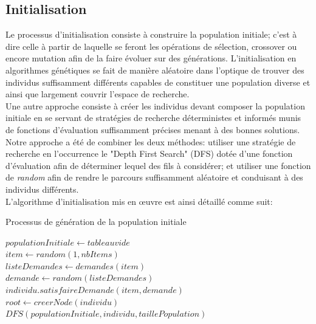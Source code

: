 \documentclass[12pt,a4paper]{article}
\begin{document}
	\subsection{Initialisation}
	Le processus d'initialisation consiste à construire la population initiale; c'est à dire celle à partir de laquelle se feront les opérations de sélection, crossover ou encore mutation afin de la faire évoluer sur des générations. L'initialisation en algorithmes génétiques se fait de manière aléatoire dans l'optique de trouver des individus suffisamment différents capables de constituer une population diverse et ainsi que largement couvrir l'espace de recherche. \\
	\hspace*{.5cm} Une autre approche consiste à créer les individus devant composer la population initiale en se servant de stratégies de recherche déterministes et informés munis de fonctions d'évaluation suffisamment précises menant à des bonnes solutions. Notre approche a été de combiner les deux méthodes: utiliser une stratégie de recherche en l’occurrence le "Depth First Search" (DFS) dotée d'une fonction d'évaluation afin de déterminer lequel des fils à considérer; et utiliser une fonction de \emph{random} afin de rendre le parcours suffisamment aléatoire et conduisant à des individus différents. \\
	\hspace*{.5cm} L'algorithme d'initialisation mis en œuvre est ainsi détaillé comme suit: \\
	
	\begin{algorithm}[H]
 		\caption{Processus de génération de la population initiale}
 		\BlankLine
 		\BlankLine
 	    $populationInitiale \gets tableau vide$  \\
 	    \BlankLine
 	    $item \gets random(1, nbItems)$ \\
 	    \BlankLine
 	    $listeDemandes \gets demandes(item)$ \\
 	    \BlankLine
 	    $demande \gets random(listeDemandes)$ \\
 	    \BlankLine
 	    $individu.satisfaireDemande(item, demande)$\\
 	    \BlankLine
 	    $root \gets creerNode(individu)$ \\
 	    \BlankLine
 	    $DFS(populationInitiale, individu, taillePopulation)$ \\
 	    \BlankLine
	\end{algorithm}
	
\end{document}
